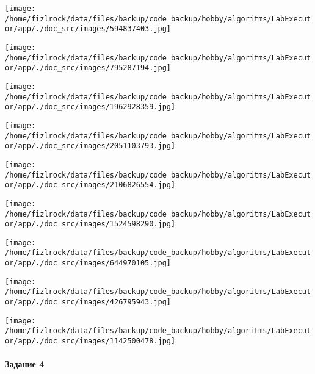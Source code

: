 \documentclass[a4paper, 12pt]{article}
\begin{document}
\texttt{[image: /home/fizlrock/data/files/backup/code\_backup/hobby/algoritms/LabExecutor/app/./doc\_src/images/594837403.jpg]}

\texttt{[image: /home/fizlrock/data/files/backup/code\_backup/hobby/algoritms/LabExecutor/app/./doc\_src/images/795287194.jpg]}

\texttt{[image: /home/fizlrock/data/files/backup/code\_backup/hobby/algoritms/LabExecutor/app/./doc\_src/images/1962928359.jpg]}

\texttt{[image: /home/fizlrock/data/files/backup/code\_backup/hobby/algoritms/LabExecutor/app/./doc\_src/images/2051103793.jpg]}

\texttt{[image: /home/fizlrock/data/files/backup/code\_backup/hobby/algoritms/LabExecutor/app/./doc\_src/images/2106826554.jpg]}

\texttt{[image: /home/fizlrock/data/files/backup/code\_backup/hobby/algoritms/LabExecutor/app/./doc\_src/images/1524598290.jpg]}

\texttt{[image: /home/fizlrock/data/files/backup/code\_backup/hobby/algoritms/LabExecutor/app/./doc\_src/images/644970105.jpg]}

\texttt{[image: /home/fizlrock/data/files/backup/code\_backup/hobby/algoritms/LabExecutor/app/./doc\_src/images/426795943.jpg]}

\texttt{[image: /home/fizlrock/data/files/backup/code\_backup/hobby/algoritms/LabExecutor/app/./doc\_src/images/1142500478.jpg]}
\pagebreak
\paragraph{Задание 4}
\end{document}
